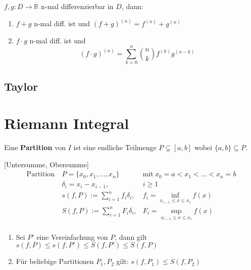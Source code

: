 \documentclass[8pt,a4paper,twocolumn,table]{extarticle}
\newcommand{\R}{\mathbb{R}}
\begin{document}
\begin{satz}{4.34}
    $f,g: D \to \R$ n-mal differenzierbar in $D$, dann:
    \begin{enumerate}
        \item $f + g$ n-mal diff. ist und $(f + g)^{(n)} = f^{(n)} + g^{(n)}$
        \item $f \cdot g$ n-mal diff. ist und
              \[ (f \cdot g)^{(n)} = \sum_{k=0}^n \binom{n}{k} f^{(k)}g^{(n - k)} \]
    \end{enumerate}
\end{satz}

\subsection{Taylor}

\section{Riemann Integral}

\begin{definition}{5.1}
    Eine \textbf{Partition} von $I$ ist eine endliche Teilmenge $P \subsetneq [a, b]$ wobei $\{a,b\} \subseteq P$.
\end{definition}

\begin{definition}{}[Untersumme, Obersumme]
    \begin{alignat*}{2}
        \mbox{Partition}\  & P = \{x_0, x_1, ..., x_n\}\           & \mbox{mit}\ x_0 = a < x_1 < ... < x_n = b \\
                           & \delta_i = x_i - x_{i - 1},           & i \ge 1                                   \\
                           & s(f, P) := \sum_{i=1}^n f_i \delta_i, & f_i = \inf_{x_{i - 1} \le x \le x_i} f(x) \\
                           & S(f, P) := \sum_{i=1}^n F_i \delta_i, & F_i = \sup_{x_{i - 1} \le x \le x_i} f(x) \\
    \end{alignat*}
\end{definition}

\begin{lemma}{5.2}
    \begin{enumerate}
        \item Sei $P'$ eine Vereinfachung von $P$, dann gilt $s(f, P) \le s(f, P') \le S(f, P') \le S(f, P)$
        \item Für beliebige Partitionen $P_1, P_2$ gilt: $s(f, P_1) \le S(f, P_2)$
    \end{enumerate}
\end{lemma}
\end{document}

